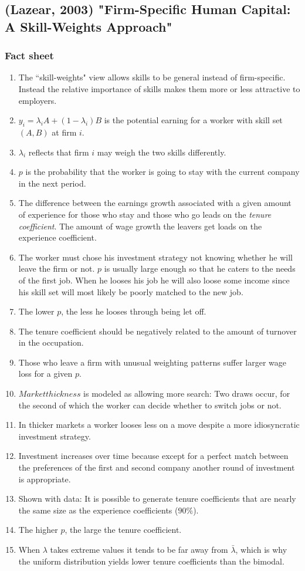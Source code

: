 \documentclass[12pt,a4paper]{article}
\begin{document}
  \subsection{(Lazear, 2003) "Firm-Specific Human Capital: A Skill-Weights Approach"} %
  \subsubsection{Fact sheet} %
  \begin{enumerate}
    \item The ``skill-weights" view allows skills to be general instead of firm-specific. Instead the relative importance of skills makes them more or less attractive to employers.
    \item $y_i = \lambda_i A+(1-\lambda_i)B$ is the potential earning for a worker with skill set $(A, B)$ at firm $i$.
    \item $\lambda_i$ reflects that firm $i$ may weigh the two skills differently.
    \item $p$ is the probability that the worker is going to stay with the current company in the next period.
    \item The difference between the earnings growth associated with a given amount of experience for those who stay and those who go leads on the \emph{tenure coefficient}. The amount of wage growth the leavers get loads on the experience coefficient.
    \item The worker must chose his investment strategy not knowing whether he will leave the firm or not. $p$ is usually large enough so that he caters to the needs of the first job. When he looses his job he will also loose some income since his skill set will most likely be poorly matched to the new job.
    \item The lower $p$, the less he looses through being let off.
    \item The tenure coefficient should be negatively related to the amount of turnover in the occupation.
    \item Those who leave a firm with unusual weighting patterns suffer larger wage loss for a given $p$.
    \item $Market thickness$ is modeled as allowing more search: Two draws occur, for the second of which the worker can decide whether to switch jobs or not.
    \item In thicker markets a worker looses less on a move despite a more idiosyncratic investment strategy.
    \item Investment increases over time because except for a perfect match between the preferences of the first and second company another round of investment is appropriate.
    \item Shown with data: It is possible to generate tenure coefficients that are nearly the same size as the experience coefficients ($90\%$).
    \item The higher $p$, the large the tenure coefficient.
    \item When $\lambda$ takes extreme values it tends to be far away from $\bar{\lambda}$, which is why the uniform distribution yields lower tenure coefficients than the bimodal.
  \end{enumerate}
\end{document}
